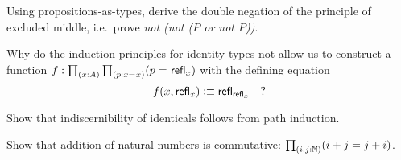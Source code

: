\begin{ex}\label{ex:not-not-lem}
Using propositions-as-types, derive the double negation of the principle of excluded middle, i.e.\ prove \emph{not (not ($P$ or not $P$))}.
\end{ex}

\begin{ex}\label{ex:without-K}
Why do the induction principles for identity types not allow us to construct a function $f: \prd{x:A}{p:\id{x}{x}} (\id{p}{\refl{x}})$ with the defining equation
\[ f(x,\mathsf{refl}_{x}) \vcentcolon\equiv \mathsf{refl}_{\mathsf{refl}_{x}} \quad ?\]
\end{ex}

\begin{ex}\label{ex:subtFromPathInd}
Show that indiscernibility of identicals follows from path induction.
\end{ex}

\begin{ex}\label{ex:add-nat-commutative}
Show that addition of natural numbers is commutative: $\prd{i,j:\nat} (i+j=j+i)$.
\end{ex}